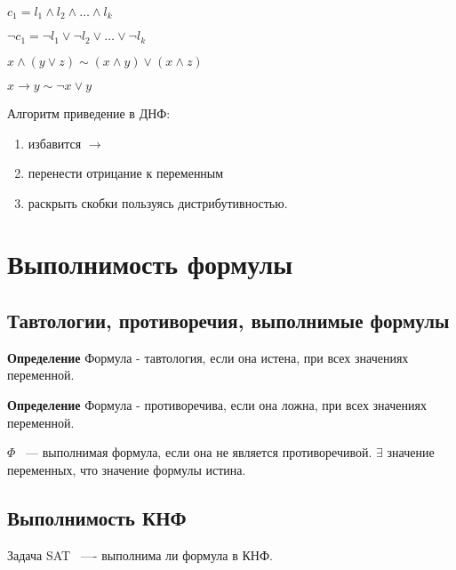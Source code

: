 \documentclass[12pt]{article}
\begin{document}
$c_1 = l_1 \wedge l_2 \wedge \ldots \wedge l_k$

$\neg c_1 = \neg l_1 \vee \neg l_2 \vee \ldots \vee \neg l_k$

$x \wedge (y \vee z) \sim (x \wedge y) \vee (x \wedge z)$

$x \to y \sim \neg x \vee y$

Алгоритм приведение в ДНФ:
\begin{enumerate}
\item избавится $\to$
\item перенести отрицание к переменным
\item раскрыть скобки пользуясь дистрибутивностью.
\end{enumerate}

\section{Выполнимость формулы}

\subsection{Тавтологии, противоречия, выполнимые формулы}
 \begin{description}
\item {\bf Определение} Формула - тавтология, если она истена, при всех значениях переменной.
\end{description}


 \begin{description}
\item {\bf Определение} Формула - противоречива, если она ложна, при всех значениях переменной.
\end{description}

$\Phi$ ~--- выполнимая формула, если она не является противоречивой.
$\exists$ значение переменных, что значение формулы истина.

\subsection{Выполнимость КНФ}

Задача SAT ~---- выполнима ли формула в КНФ.
\end{document}
